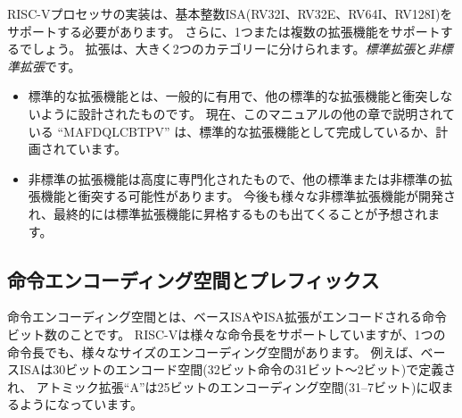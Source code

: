 RISC-Vプロセッサの実装は、基本整数ISA(RV32I、RV32E、RV64I、RV128I)をサポートする必要があります。
さらに、1つまたは複数の拡張機能をサポートするでしょう。
拡張は、大きく2つのカテゴリーに分けられます。{\em 標準拡張}と{\em 非標準拡張}です。
\begin{itemize}
\item 標準的な拡張機能とは、一般的に有用で、他の標準的な拡張機能と衝突しないように設計されたものです。
  現在、このマニュアルの他の章で説明されている ``MAFDQLCBTPV'' は、標準的な拡張機能として完成しているか、計画されています。
\item 非標準の拡張機能は高度に専門化されたもので、他の標準または非標準の拡張機能と衝突する可能性があります。
  今後も様々な非標準拡張機能が開発され、最終的には標準拡張機能に昇格するものも出てくることが予想されます。
\end{itemize}

\vspace{-0.2in}
\begin{comment}
\subsection*{Instruction Encoding Spaces and Prefixes}
\end{comment}
\subsection*{命令エンコーディング空間とプレフィックス}

\begin{comment}
An instruction encoding space is some number of instruction bits
within which a base ISA or ISA extension is encoded.  RISC-V supports
varying instruction lengths, but even within a single instruction
length, there are various sizes of encoding space available.  For
example, the base ISA is defined within a 30-bit encoding space (bits
31--2 of the 32-bit instruction), while the atomic extension ``A''
fits within a 25-bit encoding space (bits 31--7).
\end{comment}
命令エンコーディング空間とは、ベースISAやISA拡張がエンコードされる命令ビット数のことです。
RISC-Vは様々な命令長をサポートしていますが、1つの命令長でも、様々なサイズのエンコーディング空間があります。
例えば、ベースISAは30ビットのエンコード空間(32ビット命令の31ビット～2ビット)で定義され、
アトミック拡張``A''は25ビットのエンコーディング空間(31--7ビット)に収まるようになっています。

